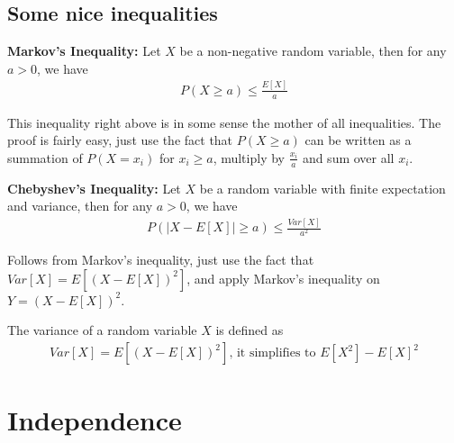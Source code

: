 \subsection{Some nice inequalities}
\begin{theorem}
    \textbf{Markov's Inequality:} Let $X$ be a non-negative random variable, then for any $a>0$, we have
    \begin{align}
        P(X \geq a) \leq \frac{E[X]}{a}
    \end{align}
\end{theorem}
This inequality right above is in some sense the mother of all inequalities. The proof is fairly easy, just use the fact that $P(X \geq a)$ can be written as a summation of $P(X = x_i)$ for $x_i \geq a$, multiply by $\frac{x_i}{a}$ and sum over all $x_i$.
\begin{theorem}
    \textbf{Chebyshev's Inequality:} Let $X$ be a random variable with finite expectation and variance, then for any $a>0$, we have
    \begin{align}
        P(|X-E[X]| \geq a) \leq \frac{Var[X]}{a^2}
    \end{align}
\end{theorem}
Follows from Markov's inequality, just use the fact that $Var[X]=E[(X-E[X])^2]$, and apply Markov's inequality on $Y=(X-E[X])^2$.
\begin{definition}
    The variance of a random variable $X$ is defined as
    \begin{align}
        Var[X]=E[(X-E[X])^2] \text{, it simplifies to } E[X^2]-E[X]^2
    \end{align}
\end{definition}
\section{Independence}